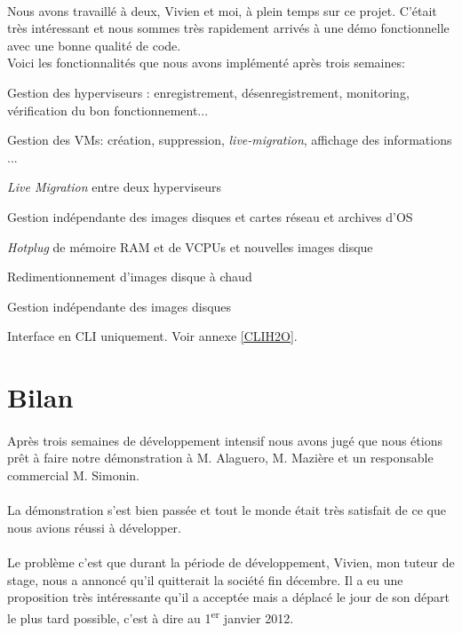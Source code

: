 \paragraph*{}
Nous avons travaillé à deux, Vivien et moi, à plein temps sur ce projet. C'était très intéressant et nous sommes très rapidement arrivés à une démo fonctionnelle avec une bonne
qualité de code.
\\
Voici les fonctionnalités que nous avons implémenté après trois semaines:
\begin{listi}
	\item Gestion des hyperviseurs : enregistrement, désenregistrement, monitoring, vérification du bon fonctionnement...
	\item Gestion des VMs: création, suppression, \emph{live-migration}, affichage des informations ...
	\item \emph{Live Migration} entre deux hyperviseurs
	\item Gestion indépendante des images disques et cartes réseau et archives d'OS
	\item \emph{Hotplug} de mémoire RAM et de VCPUs et nouvelles images disque
	\item Redimentionnement d'images disque à chaud
	\item Gestion indépendante des images disques
	\item Interface en CLI uniquement. Voir annexe \ref{CLIH2O}.
\end{listi}

\section{Bilan}

\paragraph*{}
Après trois semaines de développement intensif nous avons jugé que nous étions prêt à faire notre démonstration à M. Alaguero, M. Mazière et un responsable commercial
M. Simonin.

\paragraph*{}
La démonstration s'est bien passée et tout le monde était très satisfait de ce que nous avions réussi à développer.

\paragraph*{}
Le problème c'est que durant la période de développement, Vivien, mon tuteur de stage, nous a annoncé qu'il quitterait la société fin décembre. Il a eu une proposition très intéressante
qu'il a acceptée mais a déplacé le jour de son départ le plus tard possible, c'est à dire au 1\textsuperscript{er} janvier 2012.

